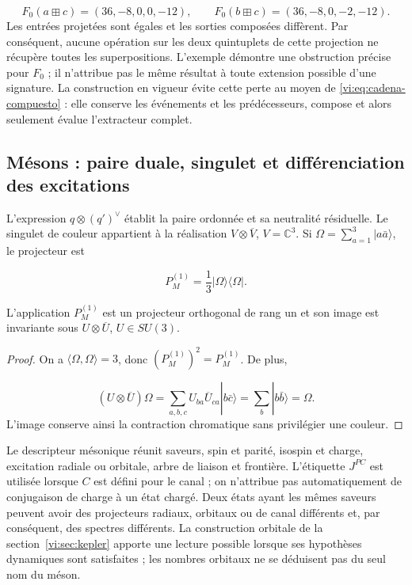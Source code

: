 \[
 F_0(a\boxplus c)=(36,-8,0,0,-12),\qquad
 F_0(b\boxplus c)=(36,-8,0,-2,-12).
\]
Les entrées projetées sont égales et les sorties composées diffèrent.
Par conséquent, aucune opération sur les deux quintuplets de cette
projection ne récupère toutes les superpositions. L’exemple démontre une
obstruction précise pour \(F_0\) ; il n’attribue pas le même résultat à toute
extension possible d’une signature. La construction en vigueur évite cette
perte au moyen de \eqref{vi:eq:cadena-compuesto} : elle conserve les événements
et les prédécesseurs, compose et alors seulement évalue l’extracteur complet.


\subsection{Mésons : paire duale, singulet et différenciation des excitations
}
\label{vi:subsec:mesones-familias}

L’expression \(q\otimes(q')^\vee\) établit la paire ordonnée et sa
neutralité résiduelle. Le singulet de couleur appartient à la réalisation
\(V\otimes\overline V\), \(V=\mathbb C^3\). Si
\(\Omega=\sum_{a=1}^3|a\bar a\rangle\), le projecteur est

\begin{equation}
 P_M^{(1)}=\frac13|\Omega\rangle\langle\Omega|.
 \label{vi:eq:singlete-meson}
\end{equation}

\begin{proposition}
L’application \(P_M^{(1)}\) est un projecteur orthogonal de rang un et
son image est invariante sous \(U\otimes\overline U\), \(U\in SU(3)\).

\end{proposition}
\begin{proof}
On a \(\langle\Omega,\Omega\rangle=3\), donc
\((P_M^{(1)})^2=P_M^{(1)}\). De plus,

\[
 (U\otimes\overline U)\Omega
 =\sum_{a,b,c}U_{ba}\overline U_{ca}|b\bar c\rangle
 =\sum_b|b\bar b\rangle=\Omega.
\]
L’image conserve ainsi la contraction chromatique sans privilégier une couleur.

\end{proof}

Le descripteur mésonique réunit saveurs, spin et parité, isospin et charge,
excitation radiale ou orbitale, arbre de liaison et frontière. L’étiquette
\(J^{PC}\) est utilisée lorsque \(C\) est défini pour le canal ; on
n’attribue pas automatiquement de conjugaison de charge à un état chargé. Deux
états ayant les mêmes saveurs peuvent avoir des projecteurs
radiaux, orbitaux ou de canal différents et, par conséquent, des spectres différents. La
construction orbitale de la section~\ref{vi:sec:kepler} apporte une
lecture possible lorsque ses hypothèses dynamiques sont satisfaites ; les nombres
orbitaux ne se déduisent pas du seul nom du méson.


